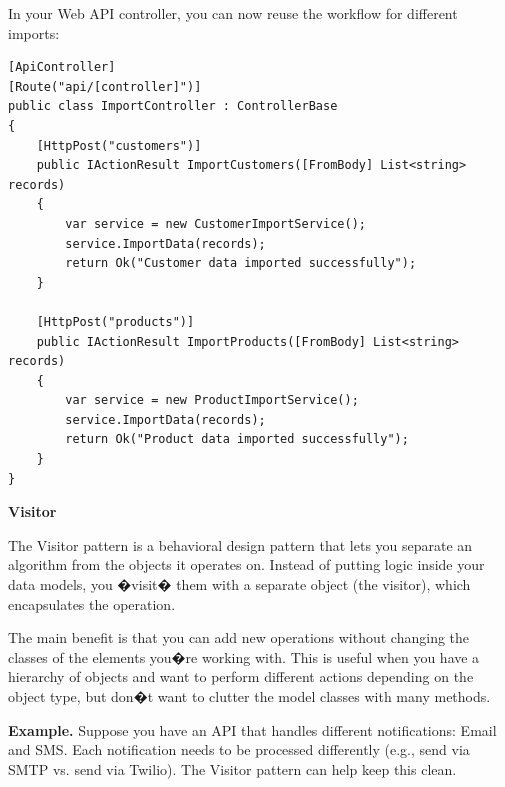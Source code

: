 In your Web API controller, you can now reuse the workflow for different imports:

\begin{lstlisting}
[ApiController]
[Route("api/[controller]")]
public class ImportController : ControllerBase
{
    [HttpPost("customers")]
    public IActionResult ImportCustomers([FromBody] List<string> records)
    {
        var service = new CustomerImportService();
        service.ImportData(records);
        return Ok("Customer data imported successfully");
    }

    [HttpPost("products")]
    public IActionResult ImportProducts([FromBody] List<string> records)
    {
        var service = new ProductImportService();
        service.ImportData(records);
        return Ok("Product data imported successfully");
    }
}

\end{lstlisting}




\medskip
\begin{center}
\textbf{Visitor}
\end{center}

The Visitor pattern is a behavioral design pattern that lets you separate an algorithm from the objects it operates on. Instead of putting logic inside your data models, you �visit� them with a separate object (the visitor), which encapsulates the operation.

The main benefit is that you can add new operations without changing the classes of the elements you�re working with. This is useful when you have a hierarchy of objects and want to perform different actions depending on the object type, but don�t want to clutter the model classes with many methods.

\textbf{Example.} Suppose you have an API that handles different notifications: Email and SMS. Each notification needs to be processed differently (e.g., send via SMTP vs. send via Twilio). The Visitor pattern can help keep this clean.


